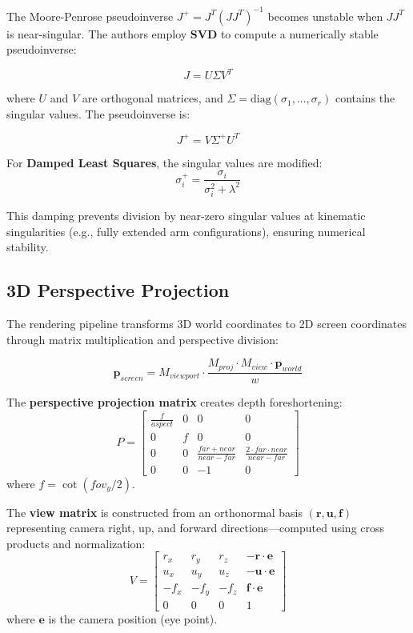 \documentclass[11pt]{article}
\begin{document}
The Moore-Penrose pseudoinverse $J^+ = J^T(JJ^T)^{-1}$ becomes unstable when $JJ^T$ is near-singular. The authors employ \textbf{SVD} to compute a numerically stable pseudoinverse:

\[
J = U \Sigma V^T
\]

where $U$ and $V$ are orthogonal matrices, and $\Sigma = \text{diag}(\sigma_1, \ldots, \sigma_r)$ contains the singular values. The pseudoinverse is:

\[
J^+ = V \Sigma^+ U^T
\]

For \textbf{Damped Least Squares}, the singular values are modified:
\[
\sigma_i^+ = \frac{\sigma_i}{\sigma_i^2 + \lambda^2}
\]

This damping prevents division by near-zero singular values at kinematic singularities (e.g., fully extended arm configurations), ensuring numerical stability.

\subsection{3D Perspective Projection}

The rendering pipeline transforms 3D world coordinates to 2D screen coordinates through matrix multiplication and perspective division:

\[
\mathbf{p}_{screen} = M_{viewport} \cdot \frac{M_{proj} \cdot M_{view} \cdot \mathbf{p}_{world}}{w}
\]

The \textbf{perspective projection matrix} creates depth foreshortening:
\[
P = \begin{bmatrix}
\frac{f}{aspect} & 0 & 0 & 0 \\
0 & f & 0 & 0 \\
0 & 0 & \frac{far+near}{near-far} & \frac{2 \cdot far \cdot near}{near-far} \\
0 & 0 & -1 & 0
\end{bmatrix}
\]
where $f = \cot(fov_y/2)$.

The \textbf{view matrix} is constructed from an orthonormal basis $(\mathbf{r}, \mathbf{u}, \mathbf{f})$ representing camera right, up, and forward directions---computed using cross products and normalization:
\[
V = \begin{bmatrix}
r_x & r_y & r_z & -\mathbf{r} \cdot \mathbf{e} \\
u_x & u_y & u_z & -\mathbf{u} \cdot \mathbf{e} \\
-f_x & -f_y & -f_z & \mathbf{f} \cdot \mathbf{e} \\
0 & 0 & 0 & 1
\end{bmatrix}
\]
where $\mathbf{e}$ is the camera position (eye point).
\end{document}
